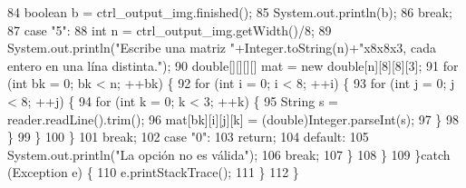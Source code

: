 \begin{DoxyCode}
84                     \textcolor{keywordtype}{boolean} b = ctrl\_output\_img.finished();
85                     System.out.println(b);
86                 \textcolor{keywordflow}{break};
87                 \textcolor{keywordflow}{case} \textcolor{stringliteral}{"5"}:
88                     \textcolor{keywordtype}{int} n = ctrl\_output\_img.getWidth()/8;
89                     System.out.println(\textcolor{stringliteral}{"Escribe una matriz "}+Integer.toString(n)+\textcolor{stringliteral}{"x8x8x3, cada entero en
       una lína distinta."});
90                     \textcolor{keywordtype}{double}[][][][] mat = \textcolor{keyword}{new} \textcolor{keywordtype}{double}[n][8][8][3];
91                     \textcolor{keywordflow}{for} (\textcolor{keywordtype}{int} bk = 0; bk < n; ++bk) \{
92                         \textcolor{keywordflow}{for} (\textcolor{keywordtype}{int} i = 0; i < 8; ++i) \{
93                             \textcolor{keywordflow}{for} (\textcolor{keywordtype}{int} j = 0; j < 8; ++j) \{
94                                 \textcolor{keywordflow}{for} (\textcolor{keywordtype}{int} k = 0; k < 3; ++k) \{
95                                     String s = reader.readLine().trim();
96                                     mat[bk][i][j][k] = (double)Integer.parseInt(s);
97                                 \}
98                             \}
99                         \}
100                     \}
101                 \textcolor{keywordflow}{break};
102                 \textcolor{keywordflow}{case} \textcolor{stringliteral}{"0"}:
103                     \textcolor{keywordflow}{return};
104                 \textcolor{keywordflow}{default}:
105                     System.out.println(\textcolor{stringliteral}{"La opción no es válida"});
106                 \textcolor{keywordflow}{break};
107             \}
108         \}
109     \}\textcolor{keywordflow}{catch} (Exception e) \{
110         e.printStackTrace();
111     \}
112     \}
\end{DoxyCode}
\mbox{\label{classpersistencia_1_1output_1_1Driver____Ctrl__Output__Img_a407a2c1e80b099b7cae5dd0a19683d09}} 
